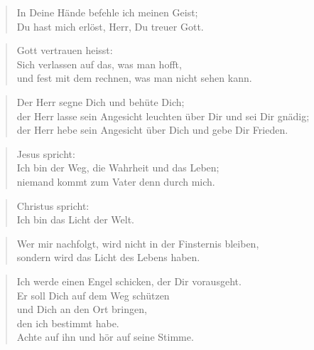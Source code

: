 \documentclass[ngerman,a4paper,11pt]{scrreprt}
\begin{document}
\begin{verse}
In Deine Hände befehle ich meinen Geist; \\
Du hast mich erlöst, Herr, Du treuer Gott. \\
\end{verse}

\begin{verse}
Gott vertrauen heisst: \\
Sich verlassen auf das, was man hofft, \\
und fest mit dem rechnen, was man nicht sehen kann. \\
\end{verse}

\begin{verse}
Der Herr segne Dich und behüte Dich; \\
der Herr lasse sein Angesicht leuchten über Dir und sei Dir gnädig; \\
der Herr hebe sein Angesicht über Dich und gebe Dir Frieden. \\
\end{verse}

\begin{verse}
Jesus spricht: \\
Ich bin der Weg, die Wahrheit und das Leben; \\
niemand kommt zum Vater denn durch mich. \\
\end{verse}

\begin{verse}
Christus spricht: \\
Ich bin das Licht der Welt. \\
\end{verse}

\begin{verse}
Wer mir nachfolgt, wird nicht in der Finsternis bleiben, \\
sondern wird das Licht des Lebens haben. \\
\end{verse}

\begin{verse}
Ich werde einen Engel schicken, der Dir vorausgeht. \\
Er soll Dich auf dem Weg schützen \\
und Dich an den Ort bringen, \\
den ich bestimmt habe. \\
Achte auf ihn und hör auf seine Stimme. \\
\end{verse}
\end{document}
